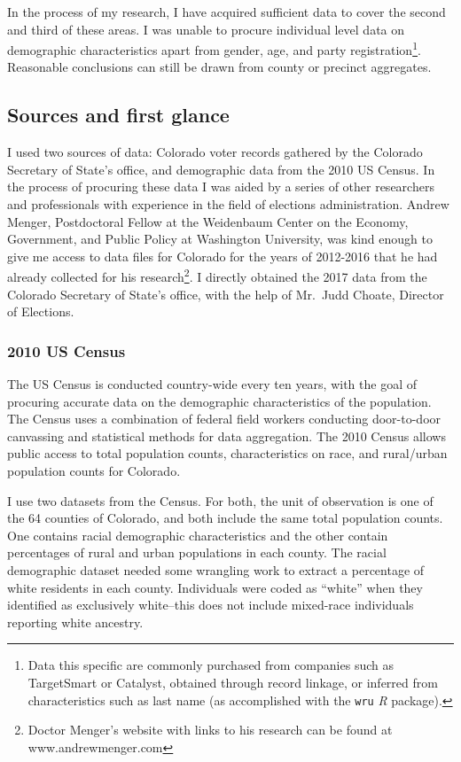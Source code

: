 \documentclass[12pt,twoside]{reedthesis}
\begin{document}
  In the process of my research, I have acquired sufficient data to cover
  the second and third of these areas. I was unable to procure individual
  level data on demographic characteristics apart from gender, age, and
  party registration\footnote{Data this specific are commonly purchased
    from companies such as TargetSmart or Catalyst, obtained through
    record linkage, or inferred from characteristics such as last name (as
    accomplished with the \texttt{wru} \textit{R} package).}. Reasonable
  conclusions can still be drawn from county or precinct aggregates.
  
  \subsection{Sources and first glance}\label{sources-and-first-glance}
  
  I used two sources of data: Colorado voter records gathered by the
  Colorado Secretary of State's office, and demographic data from the 2010
  US Census. In the process of procuring these data I was aided by a
  series of other researchers and professionals with experience in the
  field of elections administration. Andrew Menger, Postdoctoral Fellow at
  the Weidenbaum Center on the Economy, Government, and Public Policy at
  Washington University, was kind enough to give me access to data files
  for Colorado for the years of 2012-2016 that he had already collected
  for his research\footnote{Doctor Menger's website with links to his
    research can be found at www.andrewmenger.com}. I directly obtained
  the 2017 data from the Colorado Secretary of State's office, with the
  help of Mr.~Judd Choate, Director of Elections.
  
  \subsubsection{2010 US Census}\label{us-census}
  
  The US Census is conducted country-wide every ten years, with the goal
  of procuring accurate data on the demographic characteristics of the
  population. The Census uses a combination of federal field workers
  conducting door-to-door canvassing and statistical methods for data
  aggregation. The 2010 Census allows public access to total population
  counts, characteristics on race, and rural/urban population counts for
  Colorado.
  
  I use two datasets from the Census. For both, the unit of observation is
  one of the 64 counties of Colorado, and both include the same total
  population counts. One contains racial demographic characteristics and
  the other contain percentages of rural and urban populations in each
  county. The racial demographic dataset needed some wrangling work to
  extract a percentage of white residents in each county. Individuals were
  coded as ``white'' when they identified as exclusively white--this does
  not include mixed-race individuals reporting white ancestry.
  
\end{document}
